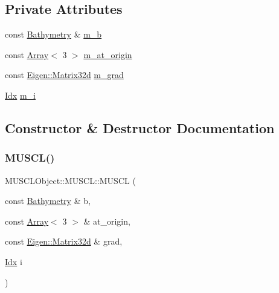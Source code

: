 \subsection*{Private Attributes}
\begin{DoxyCompactItemize}
\item 
const \hyperlink{structBathymetry}{Bathymetry} \& \hyperlink{structMUSCLObject_1_1MUSCL_abc378d985f9ba8af20edb0bdd6f93725}{m\+\_\+b}
\item 
const \hyperlink{Includes_8h_abd9de33944f934950000c3929e14ad8d}{Array}$<$ 3 $>$ \hyperlink{structMUSCLObject_1_1MUSCL_a2a28a09ef55efc3171e7383e7e362bbf}{m\+\_\+at\+\_\+origin}
\item 
const \hyperlink{namespaceEigen_a4bc13f7bc164b152307bec23b85f81ab}{Eigen\+::\+Matrix32d} \hyperlink{structMUSCLObject_1_1MUSCL_ad2960dac943f00ce6af634d959838882}{m\+\_\+grad}
\item 
\hyperlink{Includes_8h_ae78891cd308078a2f5f9e7193065c805}{Idx} \hyperlink{structMUSCLObject_1_1MUSCL_abc41561cdf727edba773ed9eb45d5c4f}{m\+\_\+i}
\end{DoxyCompactItemize}


\subsection{Constructor \& Destructor Documentation}
\mbox{\label{structMUSCLObject_1_1MUSCL_a6942ffba4a04bf862ffde0cf2f5e83b2}} 
\subsubsection{\texorpdfstring{M\+U\+S\+C\+L()}{MUSCL()}}
{\footnotesize\ttfamily M\+U\+S\+C\+L\+Object\+::\+M\+U\+S\+C\+L\+::\+M\+U\+S\+CL (\begin{DoxyParamCaption}\item[{const \hyperlink{structBathymetry}{Bathymetry} \&}]{b,  }\item[{const \hyperlink{Includes_8h_abd9de33944f934950000c3929e14ad8d}{Array}$<$ 3 $>$ \&}]{at\+\_\+origin,  }\item[{const \hyperlink{namespaceEigen_a4bc13f7bc164b152307bec23b85f81ab}{Eigen\+::\+Matrix32d} \&}]{grad,  }\item[{\hyperlink{Includes_8h_ae78891cd308078a2f5f9e7193065c805}{Idx}}]{i }\end{DoxyParamCaption})\hspace{0.3cm}{\ttfamily [inline]}}



